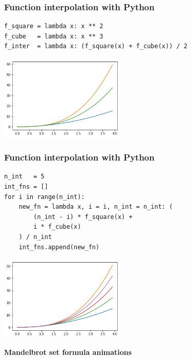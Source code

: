 \documentclass[9pt]{beamer}
\begin{document}
\begin{frame}[fragile]
  \frametitle{Function interpolation with Python}

  \begin{lstlisting}
f_square = lambda x: x ** 2
f_cube   = lambda x: x ** 3
f_inter  = lambda x: (f_square(x) + f_cube(x)) / 2
  \end{lstlisting}

  \begin{center}
    \includegraphics[width = 6cm]{images/single_interpolation.png}
  \end{center}

\end{frame}

\begin{frame}[fragile]
  \frametitle{Function interpolation with Python}

  \begin{lstlisting}
n_int   = 5
int_fns = []
for i in range(n_int):
    new_fn = lambda x, i = i, n_int = n_int: (
        (n_int - i) * f_square(x) +
        i * f_cube(x)
    ) / n_int
    int_fns.append(new_fn)
  \end{lstlisting}

  \begin{center}
    \includegraphics[width = 6cm]{images/interpolations.png}
  \end{center}

\end{frame}

\begin{frame}
  \begin{center}
    {\Huge \bf{Mandelbrot set formula animations}}
  \end{center}
\end{frame}
\end{document}
